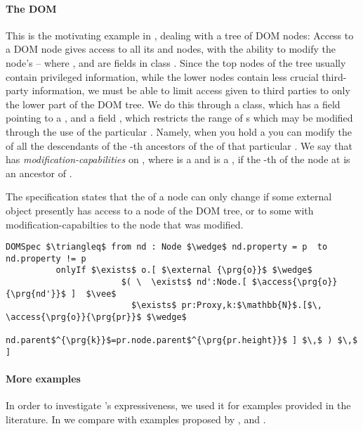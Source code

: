 \paragraph{The DOM}  %
\label{ss:DOM}
This is the motivating example in \cite{dd},
dealing with a tree of DOM nodes: Access to a DOM node
gives access to all its  and  nodes, with the ability to
modify the node's  -- where  ,  and 
are fields in class . Since the top nodes of the tree
usually contain privileged information, while the lower nodes contain
less crucial third-party information, we must be able to limit 
 access given to third parties to only the lower part of the DOM tree. We do this through a  class, which has a field  pointing to a , and a field , which restricts the range of s which may be modified through the use of the particular . Namely, when you hold a   you can modify the  of all the descendants of the    -th ancestors of the  of that particular .  We say that
 has \emph{modification-capabilities} on , where  is
a   and  is a , if the -th  
of the node at  is an ancestor of .


The specification  states that the  of a node can only change if
some external object presently has 
access to a node of the DOM tree, or to some  with modification-capabilties
to the node that was modified.
\begin{lstlisting}[language = Chainmail, mathescape=true,xleftmargin=2em,frame=lines,framexleftmargin=1.5em]
DOMSpec $\triangleq$ from nd : Node $\wedge$ nd.property = p  to nd.property != p
          onlyIf $\exists$ o.[ $\external {\prg{o}}$ $\wedge$ 
                       $( \  \exists$ nd':Node.[ $\access{\prg{o}}{\prg{nd'}}$ ]  $\vee$ 
                         $\exists$ pr:Proxy,k:$\mathbb{N}$.[$\, \access{\prg{o}}{\prg{pr}}$ $\wedge$ 
                         nd.parent$^{\prg{k}}$=pr.node.parent$^{\prg{pr.height}}$ ] $\,$ ) $\,$ ]
\end{lstlisting}

\paragraph{More examples}
In order to investigate \Nec's expressiveness,  
we used it for
examples provided in the literature. 
In  %
we compare with examples proposed by  , and .
 

